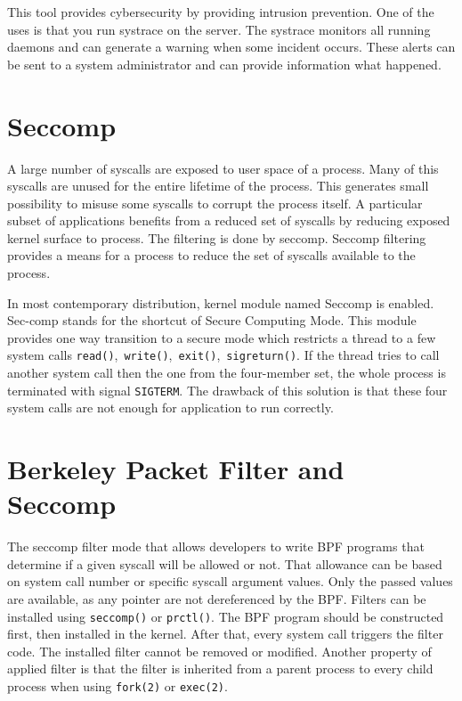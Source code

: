 This tool provides cybersecurity by providing intrusion prevention.
One of the uses is that you run systrace on the server.
The systrace monitors all running daemons and can generate a warning when some incident occurs.
These alerts can be sent to a system administrator and can provide information what happened.

\section{Seccomp}
A large number of syscalls are exposed to user space of a process. %
Many of this syscalls are unused for the entire lifetime of the process.
This generates small possibility to misuse some syscalls to corrupt the process itself.
A particular subset of applications benefits from a reduced set of syscalls by reducing exposed kernel surface to process.
The filtering is done by seccomp.
Seccomp filtering provides a means for a process to reduce the set of syscalls available to the process\cite{seccomp_kernel_doc}.

In most contemporary distribution, kernel module named Seccomp\cite{seccomp_sandbox} is enabled.
Sec-comp stands for the shortcut of Secure Computing Mode.
This module provides one way transition to a secure mode which restricts a thread to a few system calls \texttt{read()},\ \texttt{write()},\ \texttt{exit()},\ \texttt{sigreturn()}.
If the thread tries to call another system call then the one from the four-member set, the whole process is terminated with signal \texttt{SIGTERM}.
The drawback of this solution is that these four system calls are not enough for application to
run correctly.


\section{Berkeley Packet Filter and Seccomp}
The seccomp filter mode that allows developers to write BPF programs that determine if a given syscall will be allowed or not.
That allowance can be based on system call number or specific syscall argument values.
Only the passed values are available, as any pointer are not dereferenced by the BPF.
Filters can be installed using \texttt{seccomp()} or \texttt{prctl()}.
The BPF program should be constructed first, then installed in the kernel.
After that, every system call triggers the filter code.
The installed filter cannot be removed or modified.
Another property of applied filter is that the filter is inherited from a parent process to every child process when using \texttt{fork(2)} or \texttt{exec(2)}.

